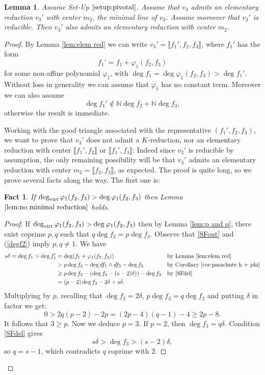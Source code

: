 \documentclass[reqno,oneside,11pt]{amsart}
\theoremstyle{plain}
\newtheorem{lemma}[theorem]{Lemma}
\newtheorem{fact}[theorem]{Fact}
\theoremstyle{definition}
\newcommand{\N}{\mathbb{N}}
\renewcommand{\phi}{\varphi}
\newcommand{\dvirt}{\deg_{\text{\rm virt}}}
\newcommand{\llb}{\llbracket}
\newcommand{\rrb}{\rrbracket}
\renewcommand{\ge}{\geqslant}
\begin{document}
\begin{lemma} \label{lem:no minimal reduction}
Assume Set-Up $\ref{setup:pivotal}$.
Assume that $v_3$ admits an elementary reduction $v_3'$ with center $m_2$, the
minimal line of $v_3$.
Assume moreover that $v_3'$ is reducible.
Then $v_3'$ also admits an elementary reduction with center $m_2$.
\end{lemma}

\begin{proof}
By Lemma \ref{lem:elem red} we can write $v_3' = \llb f_1', f_2, f_3 \rrb$,
where $f_1'$ has the form
$$f_1' = f_1+\phi_1(f_2,f_3)$$
for some non-affine polynomial $\phi_1$, with $\deg f_1 = \deg
\phi_1(f_2,f_3) >
\deg f_1'$.
Without loss in generality we can assume that $\phi_1$ has no constant term.
Moreover we can also assume
\begin{equation} \label{eq:f1'notNf_2+Nf_3}
\deg f_1' \not\in \N\deg f_2 + \N \deg f_3,
\end{equation}
otherwise the result is immediate.

Working with the good triangle associated with the representative $(f_1', f_2,
f_3)$, we want to prove that $v_3'$ does not admit a $K$-reduction, nor an
elementary reduction with center $\llb f_1', f_2 \rrb$ or $\llb f_1', f_3 \rrb$:
Indeed since $v_3'$ is reducible by assumption, the only remaining possibility
will be that $v_3'$ admits an elementary reduction with center $m_2 = \llb f_2,
f_3 \rrb$, as expected.
The proof is quite long, so we prove several facts along the way.
The first one is:

\begin{fact} \label{fact:dvirt phi1}
If $\dvirt \phi_1(f_2,f_3) > \deg \phi_1(f_2,f_3)$ then Lemma $\ref{lem:no
minimal reduction}$ holds.
\end{fact}

\begin{proof}
If $\dvirt \phi_1(f_2,f_3) > \deg \phi_1(f_2,f_3)$ then by Lemma \ref{lem:p and
q}, there exist coprime $p,q$  such that $q \deg f_2 = p\deg f_3$.
Observe that \ref{SFout} and (\ref{degf2}) imply $p,q \neq 1$.
We have
\begin{align*}
s\delta = \deg f_1 >\deg f_1' & = \deg (f_1 + \phi_1(f_2,f_3)) &&\text{by Lemma
\ref{lem:elem red}}\\
 &> p\deg f_3 - \deg df_1\wedge df_2 - \deg f_3 &&\text{by Corollary
\ref{cor:parachute h + phi}}\\
 &\ge p\deg f_3 -(\deg f_3 -(s-2)\delta)) - \deg f_3 &&\text{by \ref{SFdel}} \\
 &= (p-2)\deg f_3 - 2\delta + s\delta.
\end{align*}
Multiplying by $p$, recalling that $\deg f_2 = 2\delta$, $p\deg f_3 = q \deg
f_2$ and putting $\delta$ in factor we get:
\begin{equation} \label{eq:2q(p-2)}
0 > 2q(p-2) - 2p
  = (2p-4)(q-1) - 4
  \ge 2p -8.
\end{equation}
It follows that $3 \ge p$.
Now we deduce $p = 3$.
If $p = 2$, then $\deg f_3 = q\delta$.
Condition \ref{SFdel} gives
$$s\delta > \deg f_3 > (s-2)\delta,$$
so $q = s-1$, which contradicts $q$ coprime with $2$.


\end{proof}
\end{proof}
\end{document}
